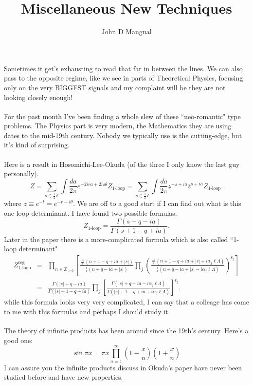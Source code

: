 \documentclass[12pt]{article}
\title{Miscellaneous New Techniques}
\author{John D Mangual}
\date{}
\begin{document}
\selectfont \fontsize{12.5}{15}\selectfont

\maketitle

\noindent Sometimes it get's exhausting to read that far in between the lines.  We can also pass to the opposite regime, like we see in parts of Theoretical Physics, focusing only on the very BIGGEST signals and my complaint will be they are not looking closely enough! \\ \\
For the past month I've been finding a whole slew of these ``neo-romantic" type problems.  The Physics part is very modern, the Mathematics they are using dates to the mid-19th century.  Nobody we typically use is the cutting-edge, but it's kind of surprising. \\ \\
Here is a result in Hosomichi-Lee-Okuda (of the three I only know the last guy personally). 
\begin{equation}
 Z
 = \sum_{s\in\frac12\mathbb Z}\int\frac{da}{2\pi}
 e^{-2ira+2is\theta} Z_\text{1-loop}
 = \sum_{s\in\frac12\mathbb Z}\int\frac{da}{2\pi}
 z^{-s+ia}\bar z^{s+ia} Z_\text{1-loop}.
\label{zs2}
\end{equation}
where $z\equiv e^{-t}=e^{-r-i\theta}$.  We are off to a good start if I can find out what is this one-loop determinant.  I have found two possible formulas:
\begin{equation}
 Z_\text{1-loop}
 = \frac{\Gamma(s+q-ia)}{\Gamma(s+1-q+ia)}.
\label{1l0}
\end{equation}
Later in the paper there is a more-complicated formula which is also called ``1-loop determinant"
\begin{eqnarray}
Z_\text{1-loop}^\text{reg} &=& \prod_{n\in\mathbb Z_{\ge0}}
\left[
 \frac{\frac {-i}\ell(n+1-q+ia+|s|)}{\frac i\ell(n+q-ia+|s|)}
 \prod_{j}
 \left(
 \frac{\frac {-i}\ell(n+1-q+ia+|s|+i\alpha_j\ell\Lambda)}
      {\frac i\ell(n+q-ia+|s|-i\alpha_j\ell\Lambda)}
 \right)^{\epsilon_j}
\right]
 \nonumber \\ &=&
 \frac{\Gamma(|s|+q-ia)}{\Gamma(|s|+1-q+ia)}
 \prod_j\left[\frac{\Gamma(|s|+q-ia-i\alpha_j\ell\Lambda)}
                 {\Gamma(|s|+1-q+ia+i\alpha_j\ell\Lambda)}\right]^{\epsilon_j}.
\label{zolpv}
\end{eqnarray}
while this formula looks very very complicated, I can say that a colleage has come to me with this formulas and perhaps I should study it.  \\ \\
The theory of infinite products has been around since the 19th's century.  Here's a good one:
$$ \sin \pi x = \pi x \prod_{n=1}^\infty \left(1 - \frac{x}{n} \right)\left(1 + \frac{x}{n} \right) $$
I can assure you the infinite products discuss in Okuda's paper have never been studied before and have new properties. 
\end{document}
